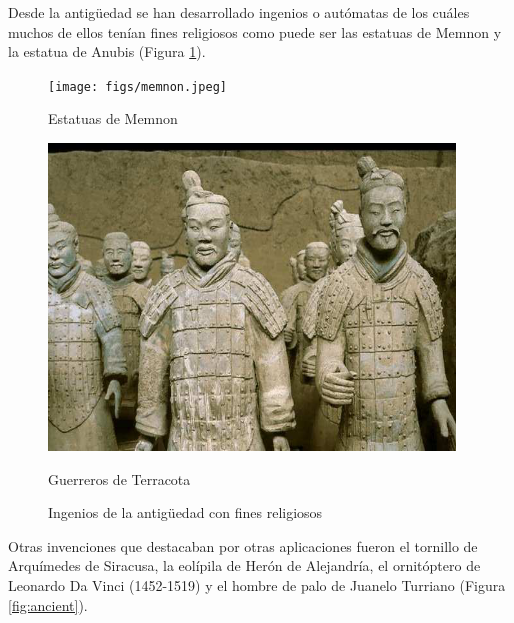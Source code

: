 Desde la antigüedad se han desarrollado ingenios o autómatas de los cuáles muchos de ellos tenían fines religiosos como puede ser las estatuas de Memnon y la estatua de Anubis (Figura \ref{fig:ancientrel}).   \\


\begin{figure}[ht!]
	\centering
	\begin{minipage}{0.3\linewidth}
		\centering
		\texttt{[image: figs/memnon.jpeg]}
		\caption*{\centering Estatuas de Memnon \cite{memnon_image}}
	\end{minipage}
	\hspace{3cm}
	\begin{minipage}{0.3\linewidth}
		\centering
		\includegraphics[width=\linewidth]{figs/terracota.png}
		\caption*{\centering Guerreros de Terracota \cite{gomezguerreros}}
	\end{minipage}
	\caption{Ingenios de la antigüedad con fines religiosos}
	\label{fig:ancientrel}
\end{figure}

 
Otras invenciones que destacaban por otras aplicaciones fueron el tornillo de Arquímedes de Siracusa, la eolípila de Herón de Alejandría, el ornitóptero de Leonardo Da Vinci (1452-1519) y el hombre de palo de Juanelo Turriano (Figura \ref{fig:ancient}).\\

